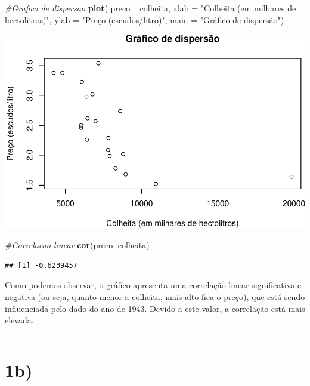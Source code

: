 \documentclass[11pt,]{article}
\makeatletter
\newenvironment{Shaded}{\begin{snugshade}}{\end{snugshade}}
\newcommand{\KeywordTok}[1]{\textcolor[rgb]{0.13,0.29,0.53}{\textbf{{#1}}}}
\newcommand{\DataTypeTok}[1]{\textcolor[rgb]{0.13,0.29,0.53}{{#1}}}
\newcommand{\StringTok}[1]{\textcolor[rgb]{0.31,0.60,0.02}{{#1}}}
\newcommand{\CommentTok}[1]{\textcolor[rgb]{0.56,0.35,0.01}{\textit{{#1}}}}
\newcommand{\NormalTok}[1]{{#1}}
\def\maxwidth{\ifdim\Gin@nat@width>\linewidth\linewidth
\else\Gin@nat@width\fi}
\let\Oldincludegraphics\includegraphics
\renewcommand{\includegraphics}[1]{\Oldincludegraphics[width=\maxwidth]{#1}}
\makeatother
\begin{document}
\begin{Shaded}
\begin{Highlighting}[]
\CommentTok{#Grafico de dispersao}
\KeywordTok{plot}\NormalTok{( preco ~}\StringTok{ }\NormalTok{colheita, }
      \DataTypeTok{xlab =} \StringTok{"Colheita (em milhares de hectolitros)"}\NormalTok{,}
      \DataTypeTok{ylab =} \StringTok{"Preço (escudos/litro)"}\NormalTok{,}
      \DataTypeTok{main =} \StringTok{"Gráfico de dispersão"}\NormalTok{)}
\end{Highlighting}
\end{Shaded}

\includegraphics{versaofinal_lista3_files/figure-latex/unnamed-chunk-2-1.pdf}

\begin{Shaded}
\begin{Highlighting}[]
\CommentTok{#Correlacao linear }
\KeywordTok{cor}\NormalTok{(preco, colheita)}
\end{Highlighting}
\end{Shaded}

\begin{verbatim}
## [1] -0.6239457
\end{verbatim}

Como podemos observar, o gráfico apresenta uma correlação linear
significativa e negativa (ou seja, quanto menor a colheita, mais alto
fica o preço), que está sendo influenciada pelo dado do ano de 1943.
Devido a este valor, a correlação está mais elevada.

\begin{center}\rule{0.5\linewidth}{\linethickness}\end{center}

\section{1b)}\label{b}
\end{document}

